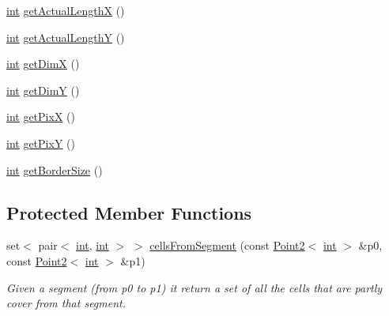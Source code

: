 \begin{DoxyCompactItemize}
\item 
\mbox{\hyperlink{draw_8hh_aa620a13339ac3a1177c86edc549fda9b}{int}} \mbox{\hyperlink{class_mapp_acb069278e8bc828245eae0092ae8efb2}{get\+Actual\+LengthX}} ()
\item 
\mbox{\hyperlink{draw_8hh_aa620a13339ac3a1177c86edc549fda9b}{int}} \mbox{\hyperlink{class_mapp_ac22e58e9558eeb4fda02318589f2e300}{get\+Actual\+LengthY}} ()
\item 
\mbox{\hyperlink{draw_8hh_aa620a13339ac3a1177c86edc549fda9b}{int}} \mbox{\hyperlink{class_mapp_a49affe385216ce94e31bfda2e2b87095}{get\+DimX}} ()
\item 
\mbox{\hyperlink{draw_8hh_aa620a13339ac3a1177c86edc549fda9b}{int}} \mbox{\hyperlink{class_mapp_adb4ec4a95723bbd391359c31a3fb6411}{get\+DimY}} ()
\item 
\mbox{\hyperlink{draw_8hh_aa620a13339ac3a1177c86edc549fda9b}{int}} \mbox{\hyperlink{class_mapp_a6fc7ef7c8e9f057938c560ff910d641d}{get\+PixX}} ()
\item 
\mbox{\hyperlink{draw_8hh_aa620a13339ac3a1177c86edc549fda9b}{int}} \mbox{\hyperlink{class_mapp_aebab0273b130d6c156bad06249e05bf9}{get\+PixY}} ()
\item 
\mbox{\hyperlink{draw_8hh_aa620a13339ac3a1177c86edc549fda9b}{int}} \mbox{\hyperlink{class_mapp_a9c285cae4a8913b851fa88df2bbfba67}{get\+Border\+Size}} ()
\end{DoxyCompactItemize}
\subsection*{Protected Member Functions}
\begin{DoxyCompactItemize}
\item 
set$<$ pair$<$ \mbox{\hyperlink{draw_8hh_aa620a13339ac3a1177c86edc549fda9b}{int}}, \mbox{\hyperlink{draw_8hh_aa620a13339ac3a1177c86edc549fda9b}{int}} $>$ $>$ \mbox{\hyperlink{class_mapp_a934e0d553769c2735e6193d1b43ddf87}{cells\+From\+Segment}} (const \mbox{\hyperlink{class_point2}{Point2}}$<$ \mbox{\hyperlink{draw_8hh_aa620a13339ac3a1177c86edc549fda9b}{int}} $>$ \&p0, const \mbox{\hyperlink{class_point2}{Point2}}$<$ \mbox{\hyperlink{draw_8hh_aa620a13339ac3a1177c86edc549fda9b}{int}} $>$ \&p1)
\begin{DoxyCompactList}\small\item\em Given a segment (from p0 to p1) it return a set of all the cells that are partly cover from that segment. \end{DoxyCompactList}\end{DoxyCompactItemize}
